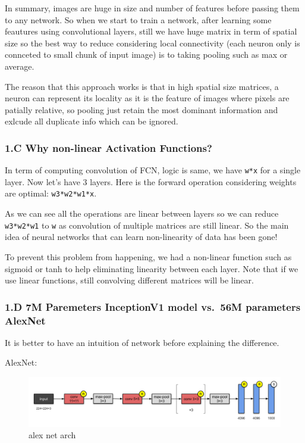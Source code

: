 \documentclass[11pt]{article}
\makeatletter
\def\maxwidth{\ifdim\Gin@nat@width>\linewidth\linewidth
    \else\Gin@nat@width\fi}
\let\Oldincludegraphics\includegraphics
\renewcommand{\includegraphics}[1]{\Oldincludegraphics[width=.8\maxwidth]{#1}}
\makeatother
\begin{document}
In summary, images are huge in size and number of features before
passing them to any network. So when we start to train a network, after
learning some feautures using convolutional layers, still we have huge
matrix in term of spatial size so the best way to reduce considering
local connectivity (each neuron only is connceted to small chunk of
input image) is to taking pooling such as max or average.

The reason that this approach works is that in high spatial size
matrices, a neuron can represent its locality as it is the feature of
images where pixels are patially relative, so pooling just retain the
most dominant information and exlcude all duplicate info which can be
ignored.

    \hypertarget{c-why-non-linear-activation-functions}{%
\subsubsection{1.C Why non-linear Activation
Functions?}\label{c-why-non-linear-activation-functions}}

In term of computing convolution of FCN, logic is same, we have
\texttt{w*x} for a single layer. Now let's have 3 layers. Here is the
forward operation considering weights are optimal: \texttt{w3*w2*w1*x}.

As we can see all the operations are linear between layers so we can
reduce \texttt{w3*w2*w1} to \texttt{w} as convolution of multiple
matrices are still linear. So the main idea of neural networks that can
learn non-linearity of data has been gone!

To prevent this problem from happening, we had a non-linear function
such as sigmoid or tanh to help eliminating linearity between each
layer. Note that if we use linear functions, still convolving different
matrices will be linear.

    \hypertarget{d-7m-paremeters-inceptionv1-model-vs.56m-parameters-alexnet}{%
\subsubsection{1.D 7M Paremeters InceptionV1 model vs.~56M parameters
AlexNet}\label{d-7m-paremeters-inceptionv1-model-vs.56m-parameters-alexnet}}

It is better to have an intuition of network before explaining the
difference.

AlexNet:

\begin{figure}
\centering
\includegraphics{wiki/1_d_1.png}
\caption{alex net arch}
\end{figure}
\end{document}
